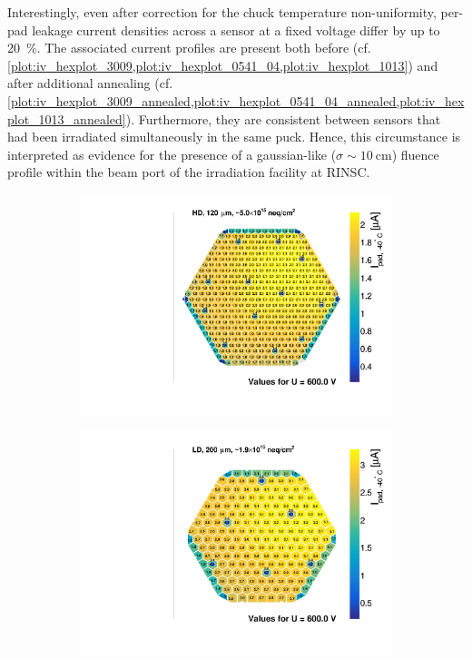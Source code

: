 Interestingly, even after correction for the chuck temperature non-uniformity, per-pad leakage current densities across a sensor at a fixed voltage differ by up to \SI{20}{\percent}.
The associated current profiles are present both before (cf. \ref{plot:iv_hexplot_3009,plot:iv_hexplot_0541_04,plot:iv_hexplot_1013}) and after additional annealing (cf. \ref{plot:iv_hexplot_3009_annealed,plot:iv_hexplot_0541_04_annealed,plot:iv_hexplot_1013_annealed}).
Furthermore, they are consistent between sensors that had been irradiated simultaneously in the same puck.
Hence, this circumstance is interpreted as evidence for the presence of a gaussian-like ($\sigma\sim\SI{10}{\centi\metre}$) fluence profile within the beam port of the irradiation facility at RINSC.
\begin{figure}
	\captionsetup[subfigure]{aboveskip=-1pt,belowskip=-1pt}
	\centering
	\begin{subfigure}[b]{0.32\textwidth}
		\includegraphics[width=0.999\textwidth]{plots/iv_hexplots/3009.pdf}
		\subcaption{
		}
		\label{plot:iv_hexplot_3009}
	\end{subfigure}
	\hfill
	\begin{subfigure}[b]{0.32\textwidth}
		\includegraphics[width=0.999\textwidth]{plots/iv_hexplots/0541_04.pdf}

\end{subfigure}
\end{figure}
